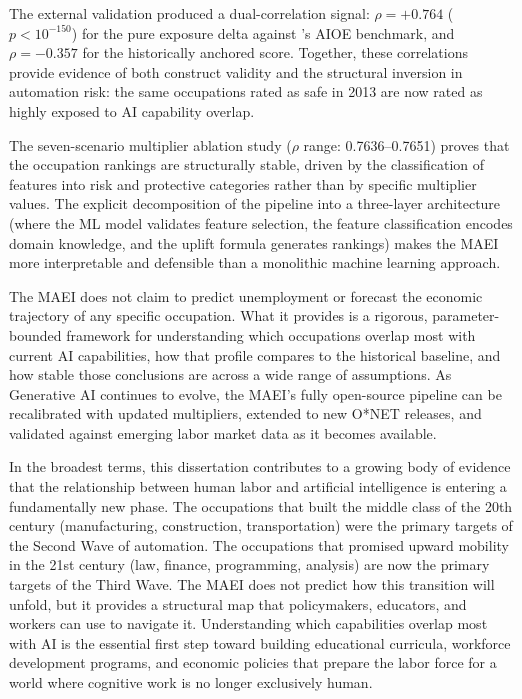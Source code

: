 The external validation produced a dual-correlation signal: $\rho = +0.764$
($p < 10^{-150}$) for the pure exposure delta against
\citet{Felten_Raj_Seamans_2021}'s AIOE benchmark, and $\rho = -0.357$ for the
historically anchored score.  Together, these correlations provide evidence
of both construct validity and the structural inversion in automation risk: the
same occupations rated as safe in 2013 are now rated as highly exposed to AI
capability overlap.

The seven-scenario multiplier ablation study ($\rho$ range: 0.7636--0.7651)
proves that the occupation rankings are structurally stable, driven by the
classification of features into risk and protective categories rather than by
specific multiplier values.  The explicit decomposition of the pipeline into a
three-layer architecture (where the ML model validates feature selection, the
feature classification encodes domain knowledge, and the uplift formula generates
rankings) makes the MAEI more interpretable and defensible than a monolithic
machine learning approach.

The MAEI does not claim to predict unemployment or forecast the economic
trajectory of any specific occupation.  What it provides is a rigorous,
parameter-bounded framework for understanding which occupations overlap most with
current AI capabilities, how that profile compares to the historical baseline,
and how stable those conclusions are across a wide range of assumptions.  As
Generative AI continues to evolve, the MAEI's fully open-source pipeline can be
recalibrated with updated multipliers, extended to new O*NET releases, and
validated against emerging labor market data as it becomes available.

In the broadest terms, this dissertation contributes to a growing body of
evidence that the relationship between human labor and artificial intelligence is
entering a fundamentally new phase.  The occupations that built the middle class
of the 20th century (manufacturing, construction, transportation) were the
primary targets of the Second Wave of automation.  The occupations that promised
upward mobility in the 21st century (law, finance, programming, analysis) are now
the primary targets of the Third Wave.  The MAEI does not predict how this
transition will unfold, but it provides a structural map that policymakers,
educators, and workers can use to navigate it.  Understanding which capabilities
overlap most with AI is the essential first step toward building educational
curricula, workforce development programs, and economic policies that prepare the
labor force for a world where cognitive work is no longer exclusively human.
